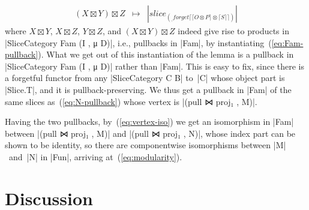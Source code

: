 \begin{itemize}
\[\begin{array}{rcl}
(X \boxtimes Y) \boxtimes Z  & \mapsto & |slice _ (_ , forget ⌈ ⌈ O ⊗ P ⌉ ⊗ ⌈ S ⌉ ⌉)|
\end{array} \]
where $X \boxtimes Y$, $X \boxtimes Z$, $Y \boxtimes Z$, and $(X \boxtimes Y) \boxtimes Z$ indeed give rise to products in |SliceCategory Fam (I , μ D)|, i.e., pullbacks in |Fam|, by instantiating~(\ref{eq:Fam-pullback}).
What we get out of this instantiation of the lemma is a pullback in |SliceCategory Fam (I , μ D)| rather than |Fam|.
This is easy to fix, since there is a forgetful functor from any |SliceCategory C B| to~|C| whose object part is |Slice.T|, and it is pullback-preserving.
We thus get a pullback in |Fam| of the same slices as~(\ref{eq:N-pullback}) whose vertex is |(pull ⋈ proj₁ , M)|.

\end{itemize}

Having the two pullbacks, by~(\ref{eq:vertex-iso}) we get an isomorphism in |Fam| between |(pull ⋈ proj₁ , M)| and |(pull ⋈ proj₁ , N)|, whose index part can be shown to be identity, so there are componentwise isomorphisms between |M|~and~|N| in |Fun|, arriving at~(\ref{eq:modularity}).

\section{Discussion}

